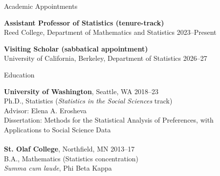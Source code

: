 \documentclass{resume} %
\begin{document}
\begin{rSection}{Academic Appointments}

\textbf{Assistant Professor of Statistics (tenure-track)}
\\ Reed College, Department of Mathematics and Statistics \hfill{2023--Present}

\textbf{Visiting Scholar (sabbatical appointment)}
\\ University of California, Berkeley, Department of Statistics \hfill{2026--27}
\end{rSection}

\begin{rSection}{Education}

\textbf{University of Washington}, Seattle, WA \hfill {2018--23} 
\\ Ph.D., Statistics (\textit{Statistics in the Social Sciences} track)
\\ Advisor: Elena A. Erosheva
\\ Dissertation: Methods for the Statistical Analysis of Preferences, with Applications to Social Science Data
\\
\\\textbf{St. Olaf College}, Northfield, MN \hfill {2013--17} 
\\ B.A., Mathematics (Statistics concentration)
\\ \textit{Summa cum laude}, Phi Beta Kappa
\end{rSection}
\end{document}
